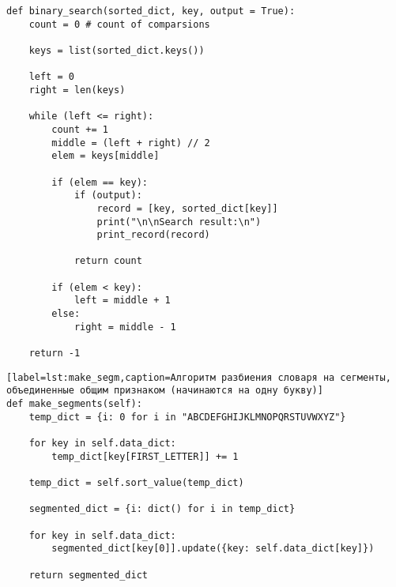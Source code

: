 \clearpage

\begin{center}
    \captionsetup{justification=raggedright,singlelinecheck=off}
    \begin{lstlisting}[label=lst:bin_search,caption=Алгоритм бинарного поиска]
def binary_search(sorted_dict, key, output = True):
	count = 0 # count of comparsions

	keys = list(sorted_dict.keys())

	left = 0 
	right = len(keys)

	while (left <= right):
		count += 1
		middle = (left + right) // 2
		elem = keys[middle]

		if (elem == key):
			if (output):
				record = [key, sorted_dict[key]]
				print("\n\nSearch result:\n")     
				print_record(record)
				
			return count

		if (elem < key):
			left = middle + 1
		else:
			right = middle - 1

	return -1
\end{lstlisting}
\end{center}


\clearpage


\begin{center}
    \captionsetup{justification=raggedright,singlelinecheck=off}
    \begin{lstlisting}[label=lst:make_segm,caption=Алгоритм разбиения словаря на сегменты, объединенные общим признаком (начинаются на одну букву)]
def make_segments(self):
	temp_dict = {i: 0 for i in "ABCDEFGHIJKLMNOPQRSTUVWXYZ"}

	for key in self.data_dict:
		temp_dict[key[FIRST_LETTER]] += 1

	temp_dict = self.sort_value(temp_dict)

	segmented_dict = {i: dict() for i in temp_dict}

	for key in self.data_dict:
		segmented_dict[key[0]].update({key: self.data_dict[key]})

	return segmented_dict
\end{lstlisting}
\end{center}


\clearpage



